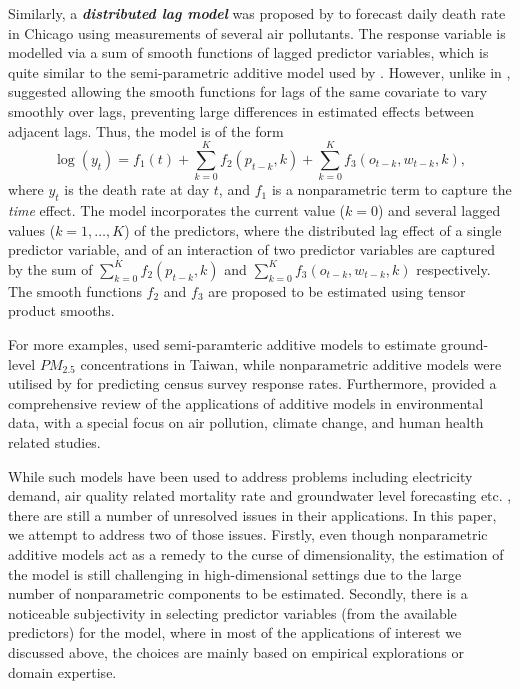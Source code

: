 \documentclass[11pt,a4paper,]{article}
\begin{document}
Similarly, a \textbf{\emph{distributed lag model}} was proposed by
\textcite{Wood2017} to forecast daily death rate in Chicago using
measurements of several air pollutants. The response variable is
modelled via a sum of smooth functions of lagged predictor variables,
which is quite similar to the semi-parametric additive model used by
\textcite{FH2012}. However, unlike in \textcite{FH2012},
\textcite{Wood2017} suggested allowing the smooth functions for lags of
the same covariate to vary smoothly over lags, preventing large
differences in estimated effects between adjacent lags. Thus, the model
is of the form \[
 \log(y_{t}) = f_{1}(t) + \sum_{k=0}^{K} f_{2}(p_{t-k}, k) + \sum_{k=0}^{K} f_{3}(o_{t-k}, w_{t-k}, k),
\] where \(y_{t}\) is the death rate at day \(t\), and \(f_{1}\) is a
nonparametric term to capture the \emph{time} effect. The model
incorporates the current value (\(k = 0\)) and several lagged values
(\(k = 1, \dots, K\)) of the predictors, where the distributed lag
effect of a single predictor variable, and of an interaction of two
predictor variables are captured by the sum of
\(\sum_{k=0}^{K} f_{2}(p_{t-k}, k)\) and
\(\sum_{k=0}^{K} f_{3}(o_{t-k}, w_{t-k}, k)\) respectively. The smooth
functions \(f_{2}\) and \(f_{3}\) are proposed to be estimated using
tensor product smooths.

For more examples, \textcite{Ho2020} used semi-paramteric additive
models to estimate ground-level \(PM_{2.5}\) concentrations in Taiwan,
while nonparametric additive models were utilised by
\textcite{Ibrahim2021} for predicting census survey response rates.
Furthermore, \textcite{Ravindra2019} provided a comprehensive review of
the applications of additive models in environmental data, with a
special focus on air pollution, climate change, and human health related
studies.

While such models have been used to address problems including
electricity demand, air quality related mortality rate and groundwater
level forecasting etc.
\autocite{FH2012,HF2010,Wood2017,Peterson2014,Rajaee2019}, there are
still a number of unresolved issues in their applications. In this
paper, we attempt to address two of those issues. Firstly, even though
nonparametric additive models act as a remedy to the curse of
dimensionality, the estimation of the model is still challenging in
high-dimensional settings due to the large number of nonparametric
components to be estimated. Secondly, there is a noticeable subjectivity
in selecting predictor variables (from the available predictors) for the
model, where in most of the applications of interest we discussed above,
the choices are mainly based on empirical explorations or domain
expertise.
\end{document}

